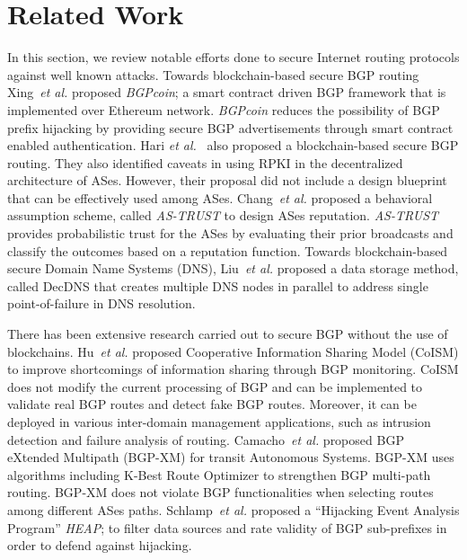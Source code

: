 \documentclass[5p]{elsarticle}
\newcommand{\etal}{{\em et al.}\xspace}
\begin{document}
\section{Related Work}\label{sec:rw}
In this section, we review notable efforts done to secure Internet routing protocols against well known attacks. Towards blockchain-based secure BGP routing Xing~\etal\cite{XingWW18} proposed  {\em BGPcoin}; a smart contract driven BGP framework that is implemented over Ethereum network. {\em BGPcoin} reduces the possibility of BGP prefix hijacking by providing secure BGP advertisements through smart contract enabled authentication. Hari \etal~\cite{HariL16} also proposed a blockchain-based secure BGP routing. They also identified caveats in using RPKI in the decentralized architecture of ASes. However, their proposal did not include a design blueprint that can be effectively used among ASes. Chang~\etal\cite{ChangVWKLSL11} proposed a behavioral assumption scheme, called {\em AS-TRUST} to design ASes reputation. {\em AS-TRUST} provides probabilistic trust for the ASes by evaluating their prior broadcasts and classify the outcomes based on a reputation function. Towards blockchain-based secure Domain Name Systems (DNS), Liu~\etal\cite{LiuLCHXW18} proposed a data storage method, called DecDNS that creates multiple DNS nodes in parallel to address single point-of-failure in DNS resolution. 

There has been extensive research carried out to secure BGP without the use of blockchains. Hu~\etal\cite{HuWL15} proposed Cooperative Information Sharing Model (CoISM) to improve shortcomings of information sharing through BGP monitoring. CoISM does not modify the current processing of BGP and can be implemented to validate real BGP routes and detect fake BGP routes. Moreover, it can be deployed in various inter-domain management applications, such as intrusion detection and failure analysis of routing. Camacho~\etal\cite{CamachoGBV13} proposed BGP eXtended Multipath (BGP-XM) for transit Autonomous Systems. BGP-XM uses algorithms including K-Best Route Optimizer  to strengthen BGP multi-path routing. BGP-XM does not violate BGP functionalities when selecting routes among different ASes paths. Schlamp~\etal\cite{SchlampHJCB16} proposed a ``Hijacking Event Analysis Program'' {\em HEAP}; to filter data sources and rate validity of BGP sub-prefixes in order to defend against hijacking. 

\end{document}
